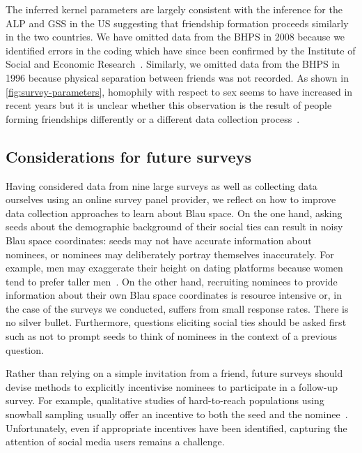 \documentclass{scrartcl}
\begin{document}
The inferred kernel parameters are largely consistent with the inference for the ALP and GSS in the US suggesting that friendship formation proceeds similarly in the two countries. We have omitted data from the BHPS in 2008 because we identified errors in the coding which have since been confirmed by the Institute of Social and Economic Research~\cite{Hoffmann2016}. Similarly, we omitted data from the BHPS in 1996 because physical separation between friends was not recorded. As shown in \cref{fig:survey-parameters}, homophily with respect to sex seems to have increased in recent years but it is unclear whether this observation is the result of people forming friendships differently or a different data collection process~\cite{Hoffmann2017}.

\subsection{Considerations for future surveys}

Having considered data from nine large surveys as well as collecting data ourselves using an online survey panel provider, we reflect on how to improve data collection approaches to learn about Blau space. On the one hand, asking seeds about the demographic background of their social ties can result in noisy Blau space coordinates: seeds may not have accurate information about nominees, or nominees may deliberately portray themselves inaccurately. For example, men may exaggerate their height on dating platforms because women tend to prefer taller men~\cite{Bruch2016}. On the other hand, recruiting nominees to provide information about their own Blau space coordinates is resource intensive or, in the case of the surveys we conducted, suffers from small response rates. There is no silver bullet. Furthermore, questions eliciting social ties should be asked first such as not to prompt seeds to think of nominees in the context of a previous question.

Rather than relying on a simple invitation from a friend, future surveys should devise methods to explicitly incentivise nominees to participate in a follow-up survey. For example, qualitative studies of hard-to-reach populations using snowball sampling usually offer an incentive to both the seed and the nominee~\cite{Biernacki1981}. Unfortunately, even if appropriate incentives have been identified, capturing the attention of social media users remains a challenge.
\end{document}
